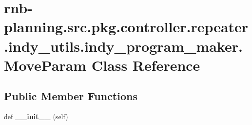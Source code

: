 \hypertarget{classrnb-planning_1_1src_1_1pkg_1_1controller_1_1repeater_1_1indy__utils_1_1indy__program__maker_1_1_move_param}{}\section{rnb-\/planning.src.\+pkg.\+controller.\+repeater.\+indy\+\_\+utils.\+indy\+\_\+program\+\_\+maker.\+Move\+Param Class Reference}
\label{classrnb-planning_1_1src_1_1pkg_1_1controller_1_1repeater_1_1indy__utils_1_1indy__program__maker_1_1_move_param}
\subsection*{Public Member Functions}
\begin{DoxyCompactItemize}
\item 
\mbox{\label{classrnb-planning_1_1src_1_1pkg_1_1controller_1_1repeater_1_1indy__utils_1_1indy__program__maker_1_1_move_param_abcee327e56e66ec2af78b64fa00df8db}} 
def {\bfseries \+\_\+\+\_\+init\+\_\+\+\_\+} (self)
\end{DoxyCompactItemize}
